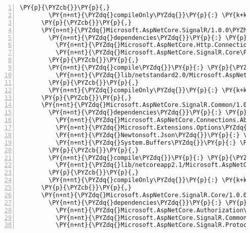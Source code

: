 \begin{Verbatim}[commandchars=\\\{\},numbers=left,firstnumber=1,stepnumber=1,numberblanklines=0]
        \PY{p}{\PYZcb{}}\PY{p}{,}
        \PY{n+nt}{\PYZdq{}compileOnly\PYZdq{}}\PY{p}{:} \PY{k+kc}{true}
      \PY{p}{\PYZcb{}}\PY{p}{,}
      \PY{n+nt}{\PYZdq{}Microsoft.AspNetCore.SignalR/1.0.0\PYZhy{}rc1\PYZhy{}final\PYZdq{}}\PY{p}{:} \PY{p}{\PYZob{}}
        \PY{n+nt}{\PYZdq{}dependencies\PYZdq{}}\PY{p}{:} \PY{p}{\PYZob{}}
          \PY{n+nt}{\PYZdq{}Microsoft.AspNetCore.Http.Connections\PYZdq{}}\PY{p}{:} \PY{l+s+s2}{\PYZdq{}1.0.0\PYZhy{}rc1\PYZhy{}final\PYZdq{}}\PY{p}{,}
          \PY{n+nt}{\PYZdq{}Microsoft.AspNetCore.SignalR.Core\PYZdq{}}\PY{p}{:} \PY{l+s+s2}{\PYZdq{}1.0.0\PYZhy{}rc1\PYZhy{}final\PYZdq{}}
        \PY{p}{\PYZcb{}}\PY{p}{,}
        \PY{n+nt}{\PYZdq{}compile\PYZdq{}}\PY{p}{:} \PY{p}{\PYZob{}}
          \PY{n+nt}{\PYZdq{}lib/netstandard2.0/Microsoft.AspNetCore.SignalR.dll\PYZdq{}}\PY{p}{:} \PY{p}{\PYZob{}}\PY{p}{\PYZcb{}}
        \PY{p}{\PYZcb{}}\PY{p}{,}
        \PY{n+nt}{\PYZdq{}compileOnly\PYZdq{}}\PY{p}{:} \PY{k+kc}{true}
      \PY{p}{\PYZcb{}}\PY{p}{,}
      \PY{n+nt}{\PYZdq{}Microsoft.AspNetCore.SignalR.Common/1.0.0\PYZhy{}rc1\PYZhy{}final\PYZdq{}}\PY{p}{:} \PY{p}{\PYZob{}}
        \PY{n+nt}{\PYZdq{}dependencies\PYZdq{}}\PY{p}{:} \PY{p}{\PYZob{}}
          \PY{n+nt}{\PYZdq{}Microsoft.AspNetCore.Connections.Abstractions\PYZdq{}}\PY{p}{:} \PY{l+s+s2}{\PYZdq{}2.1.0\PYZhy{}rc1\PYZhy{}final\PYZdq{}}\PY{p}{,}
          \PY{n+nt}{\PYZdq{}Microsoft.Extensions.Options\PYZdq{}}\PY{p}{:} \PY{l+s+s2}{\PYZdq{}2.1.0\PYZhy{}rc1\PYZhy{}final\PYZdq{}}\PY{p}{,}
          \PY{n+nt}{\PYZdq{}Newtonsoft.Json\PYZdq{}}\PY{p}{:} \PY{l+s+s2}{\PYZdq{}11.0.2\PYZdq{}}\PY{p}{,}
          \PY{n+nt}{\PYZdq{}System.Buffers\PYZdq{}}\PY{p}{:} \PY{l+s+s2}{\PYZdq{}4.5.0\PYZhy{}rc1\PYZdq{}}
        \PY{p}{\PYZcb{}}\PY{p}{,}
        \PY{n+nt}{\PYZdq{}compile\PYZdq{}}\PY{p}{:} \PY{p}{\PYZob{}}
          \PY{n+nt}{\PYZdq{}lib/netcoreapp2.1/Microsoft.AspNetCore.SignalR.Common.dll\PYZdq{}}\PY{p}{:} \PY{p}{\PYZob{}}\PY{p}{\PYZcb{}}
        \PY{p}{\PYZcb{}}\PY{p}{,}
        \PY{n+nt}{\PYZdq{}compileOnly\PYZdq{}}\PY{p}{:} \PY{k+kc}{true}
      \PY{p}{\PYZcb{}}\PY{p}{,}
      \PY{n+nt}{\PYZdq{}Microsoft.AspNetCore.SignalR.Core/1.0.0\PYZhy{}rc1\PYZhy{}final\PYZdq{}}\PY{p}{:} \PY{p}{\PYZob{}}
        \PY{n+nt}{\PYZdq{}dependencies\PYZdq{}}\PY{p}{:} \PY{p}{\PYZob{}}
          \PY{n+nt}{\PYZdq{}Microsoft.AspNetCore.Authorization\PYZdq{}}\PY{p}{:} \PY{l+s+s2}{\PYZdq{}2.1.0\PYZhy{}rc1\PYZhy{}final\PYZdq{}}\PY{p}{,}
          \PY{n+nt}{\PYZdq{}Microsoft.AspNetCore.SignalR.Common\PYZdq{}}\PY{p}{:} \PY{l+s+s2}{\PYZdq{}1.0.0\PYZhy{}rc1\PYZhy{}final\PYZdq{}}\PY{p}{,}
          \PY{n+nt}{\PYZdq{}Microsoft.AspNetCore.SignalR.Protocols.Json\PYZdq{}}\PY{p}{:} \PY{l+s+s2}{\PYZdq{}1.0.0\PYZhy{}rc1\PYZhy{}final\PYZdq{}}\PY{p}{,}

\end{Verbatim}
